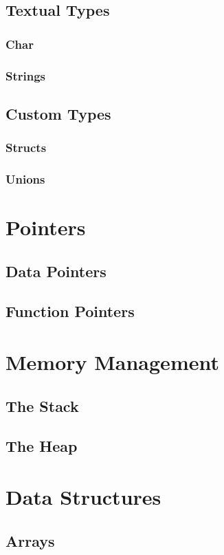\documentclass[14pt,table]{extbook}
\begin{document}
			\section{Textual Types}
				\subsection{Char}
				\subsection{Strings}

			\section{Custom Types}
				\subsection{Structs}
				\subsection{Unions}

		\chapter{Pointers}
			\section{Data Pointers}
			\section{Function Pointers}

	    \chapter{Memory Management}
	        \section{The Stack}
	        \section{The Heap}

	    \chapter{Data Structures}
	        \section{Arrays}
\end{document}
